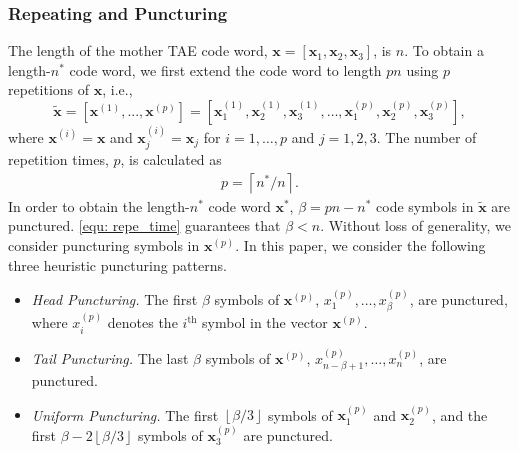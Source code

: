 \documentclass [PhD] {uclathes}
\begin{document}
\subsubsection{Repeating and Puncturing} The length of the mother TAE code word,   $\mathbf{x}=[\mathbf{x}_1,\mathbf{x}_2,\mathbf{x}_3]$, is $n$. To obtain a length-$n^*$ code word, we first extend the code word to length $pn$ using $p$ repetitions of $\mathbf{x}$, i.e.,
$$
    \tilde{\mathbf{x}}
    =[\mathbf{x}^{(1)},...,\mathbf{x}^{(p)}]\label{equ: rep}
    =[\mathbf{x}_1^{(1)},\mathbf{x}_2^{(1)},\mathbf{x}_3^{(1)},\ldots, \mathbf{x}_1^{(p)},\mathbf{x}_2^{(p)},\mathbf{x}_3^{(p)}],
$$
where $\mathbf{x}^{(i)}=\mathbf{x}$ and $\mathbf{x}_{j}^{(i)}=\mathbf{x}_j$ for $i=1,\ldots,p$ and $j=1,2,3$.
The number of repetition times, $p$, is calculated as
\begin{align}\label{equ: repe_time}
    p=\left\lceil{n^*}/{n}\right\rceil.  
\end{align}
In order to obtain the length-$n^*$ code word $\mathbf{x}^*$, $\beta=pn-n^*$ code symbols in $\tilde{\mathbf{x}}$ are punctured. \eqref{equ: repe_time} guarantees that $\beta<n$. Without loss of generality, we consider puncturing symbols in $\mathbf{x}^{(p)}$. 
In this paper, we consider the following three heuristic puncturing patterns. 

\begin{itemize}
    \item \textit{Head Puncturing.} The first $\beta$ symbols of $\mathbf{x}^{(p)}$, $x^{(p)}_{1},\ldots,\allowbreak x^{(p)}_{\beta}$, are punctured, where $x_i^{(p)}$ denotes the $i^{\text{th}}$ symbol in the vector $\mathbf{x}^{(p)}$.
    \item \textit{Tail Puncturing.} The last $\beta$ symbols of $\mathbf{x}^{(p)}$,  $x^{(p)}_{n-\beta+1},\ldots,\allowbreak x^{(p)}_{n}$, are punctured.
    \item \textit{Uniform Puncturing.} The first $\left\lfloor {\beta}/{3} \right\rfloor$ symbols of $\mathbf{x}_{1}^{(p)}$ and $\mathbf{x}_{2}^{(p)}$, and the first $\beta-2\left\lfloor {\beta}/{3} \right\rfloor$ symbols of $\mathbf{x}_{3}^{(p)}$ are punctured.
\end{itemize}
\end{document}
